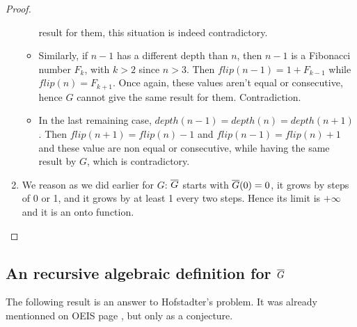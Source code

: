 \documentclass[a4paper,11pt]{article}
\begin{document}
\begin{proof}
\begin{enumerate}
\begin{itemize}
    result for them, this situation is indeed contradictory.
  \item Similarly, if $n-1$ has a different depth than $n$, then
    $n-1$ is a Fibonacci number $F_k$, with $k>2$ since $n>3$.
    Then $flip(n-1)=1+F_{k-1}$ while $flip(n)=F_{k+1}$.
    Once again, these values aren't equal or consecutive,
    hence $G$ cannot give the same result for them. Contradiction.
  \item In the last remaining case, 
    $depth(n-1)=depth(n)=depth(n+1)$.
    Then $flip(n+1)=flip(n)-1$ and $flip(n-1)=flip(n)+1$ and
    these value are non equal or consecutive, while having the
    same result by $G$, which is contradictory.
  \end{itemize}
\item We reason as we did earlier for $G$: $\overline{G}$ starts with
$\overline{G}(0)=0$, it grows by steps of 0 or 1, and it grows by at
least 1 every two steps. Hence its limit is $+\infty$ and it is
an onto function.
\end{enumerate}
\end{proof}

\subsection*{An recursive algebraic definition for $\overline{G}$}

The following result is an answer to Hofstadter's problem.
It was already mentionned on OEIS page \cite{??}, but only as
a conjecture.

\newcommand{\nn}{\overline{n}}
\end{document}
